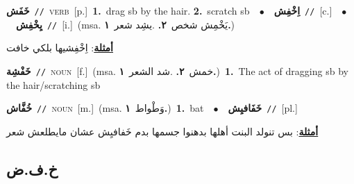 \documentclass[10pt,a4paper,twoside]{article} %
\begin{document}
\begin{multicols}{2}
{\setlength\topsep{0pt}\textbf{\foreignlanguage{arabic}{خَفَش}}\ {\color{gray}\texttt{//}\color{black}}\ \textsc{verb}\ [p.]\ \textbf{1.}~drag sb by the hair.  \textbf{2.}~scratch sb\ \ $\bullet$\ \ \setlength\topsep{0pt}\textbf{\foreignlanguage{arabic}{اِخْفِش}}\ {\color{gray}\texttt{//}\color{black}}\ [c.]\ \ $\bullet$\ \ \setlength\topsep{0pt}\textbf{\foreignlanguage{arabic}{يِخْفِش}}\ {\color{gray}\texttt{//}\color{black}}\ [i.]\ \color{gray}(msa. \foreignlanguage{arabic}{يَخْمِش شخص}~\foreignlanguage{arabic}{\textbf{٢.}}  .\foreignlanguage{arabic}{يشِد شعر}~\foreignlanguage{arabic}{\textbf{١.}})\color{black}\  \begin{flushright}\color{gray}\foreignlanguage{arabic}{\textbf{\underline{\foreignlanguage{arabic}{أمثلة}}}: اِخْفِشيها بلكي خافت}\end{flushright}\color{black}} \vspace{2mm}

{\setlength\topsep{0pt}\textbf{\foreignlanguage{arabic}{خَفْشِة}}\ {\color{gray}\texttt{//}\color{black}}\ \textsc{noun}\ [f.]\ \color{gray}(msa. \foreignlanguage{arabic}{خمش}~\foreignlanguage{arabic}{\textbf{٢.}}  .\foreignlanguage{arabic}{شد الشعر}~\foreignlanguage{arabic}{\textbf{١.}})\color{black}\ \textbf{1.}~The act of dragging sb by the hair/scratching sb\ } \vspace{2mm}

{\setlength\topsep{0pt}\textbf{\foreignlanguage{arabic}{خُفَّاش}}\ {\color{gray}\texttt{//}\color{black}}\ \textsc{noun}\ [m.]\ \color{gray}(msa. \foreignlanguage{arabic}{وَطْواط}~\foreignlanguage{arabic}{\textbf{١.}})\color{black}\ \textbf{1.}~bat\ \ $\bullet$\ \ \setlength\topsep{0pt}\textbf{\foreignlanguage{arabic}{خَفَافيِش}}\ {\color{gray}\texttt{//}\color{black}}\ [pl.]\  \begin{flushright}\color{gray}\foreignlanguage{arabic}{\textbf{\underline{\foreignlanguage{arabic}{أمثلة}}}: بس تنولد البنت أهلها بدهنوا جسمها بدم خَفافيِش عشان مايطلعش شعر}\end{flushright}\color{black}} \vspace{2mm}

\vspace{-3mm}
\subsection*{\color{blue}\foreignlanguage{arabic}{خ.ف.ض}\color{blue}{}} 


\end{multicols}
\end{document}
